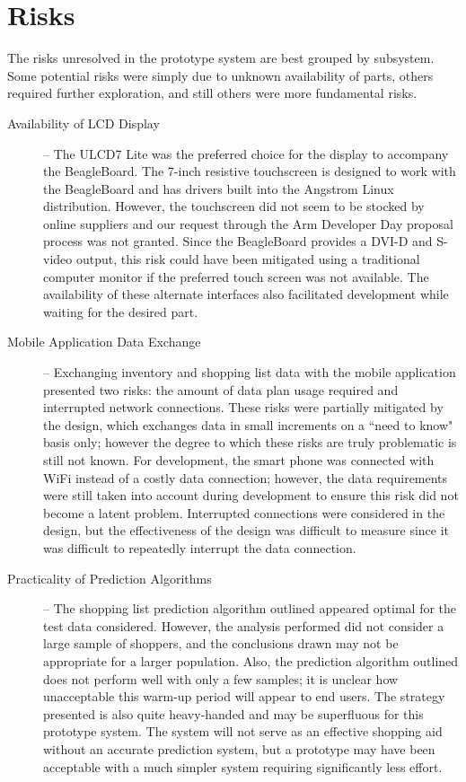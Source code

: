 \documentclass[11pt]{article} %
\begin{document}
\section{Risks}
The risks unresolved in the prototype system are best grouped by subsystem. Some potential risks were simply due to unknown availability of parts, others required further exploration, and still others were more fundamental risks.
\begin{description}
\item[Availability of LCD Display] -- The ULCD7 Lite was the preferred choice for the display to accompany the BeagleBoard. The 7-inch resistive touchscreen is designed to work with the BeagleBoard and has drivers built into the Angstrom Linux distribution. However, the touchscreen did not seem to be stocked by online suppliers and our request through the Arm Developer Day proposal process was not granted. Since the BeagleBoard provides a DVI-D and S-video output, this risk could have been mitigated using a traditional computer monitor if the preferred touch screen was not available. The availability of these alternate interfaces also facilitated development while waiting for the desired part.
\item[Mobile Application Data Exchange] -- Exchanging inventory and shopping list data with the mobile application presented two risks: the amount of data plan usage required and interrupted network connections. These risks were partially mitigated by the design, which exchanges data in small increments on a ``need to know" basis only; however the degree to which these risks are truly problematic is still not known. For development, the smart phone was connected with WiFi instead of a costly data connection; however, the data requirements were still taken into account during development to ensure this risk did not become a latent problem. Interrupted connections were considered in the design, but the effectiveness of the design was difficult to measure since it was difficult to repeatedly interrupt the data connection.
\item[Practicality of Prediction Algorithms] -- The shopping list prediction algorithm outlined appeared optimal for the test data considered. However, the analysis performed did not consider a large sample of shoppers, and the conclusions drawn may not be appropriate for a larger population. Also, the prediction algorithm outlined does not perform well with only a few samples; it is unclear how unacceptable this warm-up period will appear to end users. The strategy presented is also quite heavy-handed and may be superfluous for this prototype system. The system will not serve as an effective shopping aid without an accurate prediction system, but a prototype may have been acceptable with a much simpler system requiring significantly less effort.

\end{description}
\end{document}
